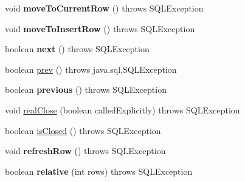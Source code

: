 \begin{DoxyCompactItemize}
void {\bfseries move\+To\+Current\+Row} ()  throws S\+Q\+L\+Exception 
\item 
\mbox{\label{classcom_1_1mysql_1_1cj_1_1jdbc_1_1result_1_1_result_set_impl_a6cb04d70ac9625266ee7709ea06f380a}} 
void {\bfseries move\+To\+Insert\+Row} ()  throws S\+Q\+L\+Exception 
\item 
\mbox{\label{classcom_1_1mysql_1_1cj_1_1jdbc_1_1result_1_1_result_set_impl_a4f0a3d623b2e066d6bd3324bdeaac087}} 
boolean {\bfseries next} ()  throws S\+Q\+L\+Exception 
\item 
boolean \mbox{\hyperlink{classcom_1_1mysql_1_1cj_1_1jdbc_1_1result_1_1_result_set_impl_a8ee52e92f7e5e671bf694f728936171e}{prev}} ()  throws java.\+sql.\+S\+Q\+L\+Exception 
\item 
\mbox{\label{classcom_1_1mysql_1_1cj_1_1jdbc_1_1result_1_1_result_set_impl_a01b45fa8c2b4afe82d82955c8d846992}} 
boolean {\bfseries previous} ()  throws S\+Q\+L\+Exception 
\item 
void \mbox{\hyperlink{classcom_1_1mysql_1_1cj_1_1jdbc_1_1result_1_1_result_set_impl_a33dfcef00d2e567cee58610ade647321}{real\+Close}} (boolean called\+Explicitly)  throws S\+Q\+L\+Exception 
\item 
boolean \mbox{\hyperlink{classcom_1_1mysql_1_1cj_1_1jdbc_1_1result_1_1_result_set_impl_a348d7112c64ce23460634afa8e0fa748}{is\+Closed}} ()  throws S\+Q\+L\+Exception 
\item 
\mbox{\label{classcom_1_1mysql_1_1cj_1_1jdbc_1_1result_1_1_result_set_impl_aabf0910c2996fcdb2f385bcba4811de1}} 
void {\bfseries refresh\+Row} ()  throws S\+Q\+L\+Exception 
\item 
\mbox{\label{classcom_1_1mysql_1_1cj_1_1jdbc_1_1result_1_1_result_set_impl_a0e8802f09b0fd17669cb46ba6c3c3457}} 
boolean {\bfseries relative} (int rows)  throws S\+Q\+L\+Exception 
\item 
\mbox{\label{classcom_1_1mysql_1_1cj_1_1jdbc_1_1result_1_1_result_set_impl_a19fe8a7a599a6d4152e56448c8f10c62}} 

\end{DoxyCompactItemize}
